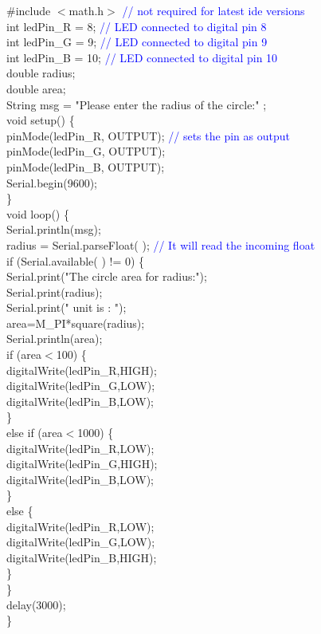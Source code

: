 \documentclass[12pt,a4paper]{article}
\begin{document}
\#include $<$math.h$>$ \textcolor{blue}{// not required for latest ide versions}\\
int ledPin\_R = 8; \textcolor{blue}{// LED connected to digital pin 8}\\
int ledPin\_G = 9; \textcolor{blue}{// LED connected to digital pin 9}\\
int ledPin\_B = 10; \textcolor{blue}{// LED connected to digital pin 10}\\
double radius; \\
double area;\\
String msg = "Please enter the radius of the circle:" ;\\[9pt]
void setup() \{\\
  pinMode(ledPin\_R, OUTPUT); \textcolor{blue}{// sets the pin as output}\\
  pinMode(ledPin\_G, OUTPUT);\\
  pinMode(ledPin\_B, OUTPUT);\\
  Serial.begin(9600); \\
\}\\[9pt]
void loop() \{\\
  Serial.println(msg);\\
  radius = Serial.parseFloat( );  \textcolor{blue}{// It will read the incoming float}\\

  if (Serial.available( ) != 0) \{\\  
  
  Serial.print("The circle area for radius:");\\
  Serial.print(radius);\\
  Serial.print(" unit is : ");\\
  area=M\_PI*square(radius);\\
  Serial.println(area); \\   
  
  if (area$<$100) \{\\
    digitalWrite(ledPin\_R,HIGH);\\
    digitalWrite(ledPin\_G,LOW);\\
    digitalWrite(ledPin\_B,LOW);\\
  \}\\ 
  else if (area$<$1000) \{\\
    digitalWrite(ledPin\_R,LOW);\\
    digitalWrite(ledPin\_G,HIGH);\\
    digitalWrite(ledPin\_B,LOW);\\
  \}\\
  else \{\\
   digitalWrite(ledPin\_R,LOW);\\
    digitalWrite(ledPin\_G,LOW);\\
    digitalWrite(ledPin\_B,HIGH);\\
  \}\\
  \}\\
  delay(3000);\\
  \}
\end{document}
